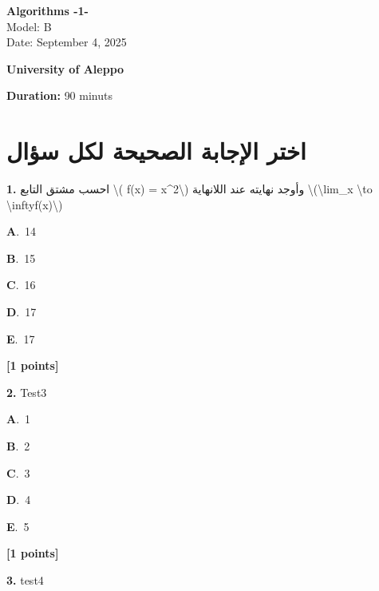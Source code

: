 \documentclass[12pt]{article}
\newcommand{\choice}[3]{%
  \noindent\textbf{#1}.~#2\hfill#3\par\vspace{0.25em}
}
\begin{document}
\begin{flushright}
{\Large \textbf{{\textenglish{Algorithms -1-}}}}\\[0.25em]
{\normalsize \textenglish{Model: }{\textenglish{B}}}\\[0.1em]
{\normalsize \textenglish{Date: }{\textenglish{September 4, 2025}}}
\end{flushright}

\vspace{0.6cm}

\noindent
\begin{minipage}[t]{0.65\textwidth}
  \raggedright
  \textbf{{\textenglish{University of Aleppo}}}\\[0.3em]
\end{minipage}\hfill
\begin{minipage}[t]{0.3\textwidth}
  \raggedleft
  \textenglish{\textbf{Duration: }}{\textenglish{90 minuts}}
\end{minipage}

\vspace{0.9cm}

\section*{اختر الإجابة الصحيحة لكل سؤال}

\noindent \textbf{\textenglish{1.}} {\textarabic{احسب مشتق التابع \textbackslash{}( f(x) = x\^{}2\textbackslash{}) وأوجد نهايته عند اللانهاية \textbackslash{}(\textbackslash{}lim\_{x \textbackslash{}to \textbackslash{}infty}f(x)\textbackslash{})}}

\noindent\choice{A}{{\textenglish{14}}}{}
\noindent\choice{B}{{\textenglish{15}}}{}
\noindent\choice{C}{{\textenglish{16}}}{}
\noindent\choice{D}{{\textenglish{17}}}{}
\noindent\choice{E}{{\textenglish{17}}}{}
\hfill \textbf{[1 points]}\vspace{0.5em}

\noindent \textbf{\textenglish{2.}} {\textenglish{Test3}}

\noindent\choice{A}{{\textenglish{1}}}{}
\noindent\choice{B}{{\textenglish{2}}}{}
\noindent\choice{C}{{\textenglish{3}}}{}
\noindent\choice{D}{{\textenglish{4}}}{}
\noindent\choice{E}{{\textenglish{5}}}{}
\hfill \textbf{[1 points]}\vspace{0.5em}

\noindent \textbf{\textenglish{3.}} {\textenglish{test4}}
\end{document}
